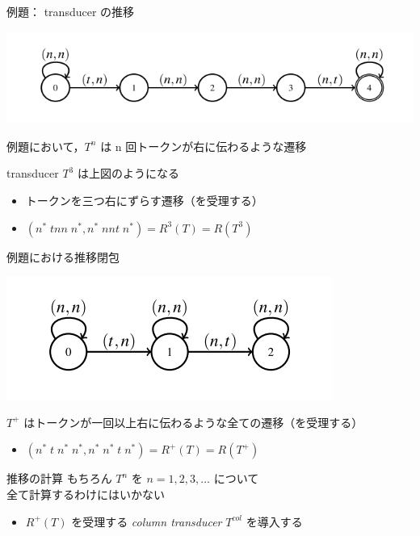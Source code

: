 \documentclass[presentation, xetex]{beamer}
\begin{document}
\begin{frame}[label={sec:orgad46fa7}]{例題： transducer の推移}
\begin{center}
\includegraphics[width=.9\linewidth]{./images/3-transducer.png}
\end{center}

例題において，\(T^n\) は n 回トークンが右に伝わるような遷移

transducer \(T^3\) は上図のようになる
\begin{itemize}
\item トークンを三つ右にずらす遷移（を受理する）
\item \((n^* \; tnn \; n^*, n^* \; nnt \; n^*) = R^3(T) = R(T^3)\)
\end{itemize}
\end{frame}



\begin{frame}[label={sec:org360dbf4}]{例題における推移閉包}
\begin{center}
\includegraphics[width=.9\linewidth]{./images/n-transitive-transducer.png}
\end{center}

\(T^+\) はトークンが一回以上右に伝わるような全ての遷移（を受理する）
\begin{itemize}
\item \((n^* \; t \; n^* \; n^* , n^* \; n^* \; t \; n^*) = R^+(T) = R(T^+)\)
\end{itemize}
\end{frame}



\begin{frame}[label={sec:orge948584}]{推移の計算}
もちろん \(T^n\) を \(n = 1, 2, 3, \dots\) について \\
全て計算するわけにはいかない
\begin{itemize}
\item \(R^+(T)\) を受理する \emph{column transducer} \(T^{col}\) を導入する
\end{itemize}
\end{frame}
\end{document}
